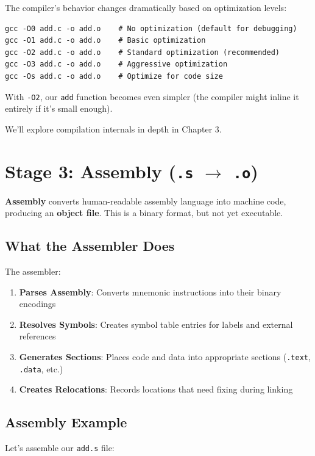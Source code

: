 The compiler's behavior changes dramatically based on optimization levels:

\begin{verbatim}
gcc -O0 add.c -o add.o    # No optimization (default for debugging)
gcc -O1 add.c -o add.o    # Basic optimization
gcc -O2 add.c -o add.o    # Standard optimization (recommended)
gcc -O3 add.c -o add.o    # Aggressive optimization
gcc -Os add.c -o add.o    # Optimize for code size
\end{verbatim}

With \texttt{-O2}, our \texttt{add} function becomes even simpler (the compiler might inline it entirely if it's small enough).

We'll explore compilation internals in depth in Chapter 3.

\section{Stage 3: Assembly (\texttt{.s} $\to$ \texttt{.o})}

\textbf{Assembly} converts human-readable assembly language into machine code, producing an \textbf{object file}. This is a binary format, but not yet executable.

\subsection{What the Assembler Does}

The assembler:

\begin{enumerate}
    \item \textbf{Parses Assembly}: Converts mnemonic instructions into their binary encodings
    \item \textbf{Resolves Symbols}: Creates symbol table entries for labels and external references
    \item \textbf{Generates Sections}: Places code and data into appropriate sections (\texttt{.text}, \texttt{.data}, etc.)
    \item \textbf{Creates Relocations}: Records locations that need fixing during linking
\end{enumerate}

\subsection{Assembly Example}

Let's assemble our \texttt{add.s} file:


